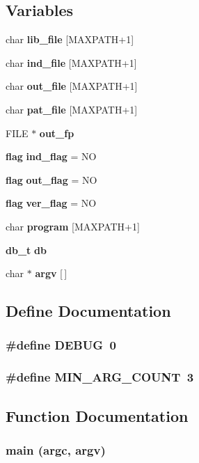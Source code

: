 \subsection*{Variables}
\begin{CompactItemize}
\item 
char {\bf lib\_\-file} [MAXPATH+1]
\item 
char {\bf ind\_\-file} [MAXPATH+1]
\item 
char {\bf out\_\-file} [MAXPATH+1]
\item 
char {\bf pat\_\-file} [MAXPATH+1]
\item 
FILE $\ast$ {\bf out\_\-fp}
\item 
{\bf flag} {\bf ind\_\-flag} = NO
\item 
{\bf flag} {\bf out\_\-flag} = NO
\item 
{\bf flag} {\bf ver\_\-flag} = NO
\item 
char {\bf program} [MAXPATH+1]
\item 
{\bf db\_\-t} {\bf db}
\item 
char $\ast$ {\bf argv} [$\,$]
\end{CompactItemize}


\subsection{Define Documentation}
\subsubsection{\setlength{\rightskip}{0pt plus 5cm}\#define DEBUG\ 0}\label{Pilar__4_8c_a1}


\subsubsection{\setlength{\rightskip}{0pt plus 5cm}\#define MIN\_\-ARG\_\-COUNT\ 3}\label{Pilar__4_8c_a0}




\subsection{Function Documentation}
\subsubsection{\setlength{\rightskip}{0pt plus 5cm}main (argc, {\bf argv})}\label{Pilar__4_8c_a18}


